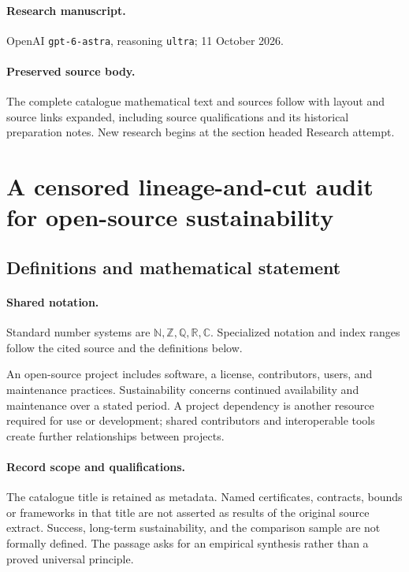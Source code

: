 \documentclass[11pt]{article}
\begin{document}
\paragraph{Research manuscript.} OpenAI \texttt{gpt-6-astra}, reasoning \texttt{ultra}; 11 October 2026.
\paragraph{Preserved source body.} The complete catalogue mathematical text and sources follow with layout and source links expanded, including source qualifications and its historical preparation notes. New research begins at the section headed Research attempt.

\section{A censored lineage-and-cut audit for open-source sustainability}\label{statement}

\subsection{Definitions and mathematical statement}

\paragraph{Shared notation.}Standard number systems are $\mathbb N,\mathbb Z,\mathbb Q,\mathbb R,\mathbb C$. Specialized notation and index ranges follow the cited source and the definitions below.


An open-source project includes software, a license, contributors, users, and maintenance practices. Sustainability concerns continued availability and maintenance over a stated period. A project dependency is another resource required for use or development; shared contributors and interoperable tools create further relationships between projects.
\paragraph{Record scope and qualifications.}
The catalogue title is retained as metadata. Named certificates, contracts, bounds or frameworks in that title are not asserted as results of the original source extract.
Success, long-term sustainability, and the comparison sample are not formally defined. The passage asks for an empirical synthesis rather than a proved universal principle.
\end{document}
